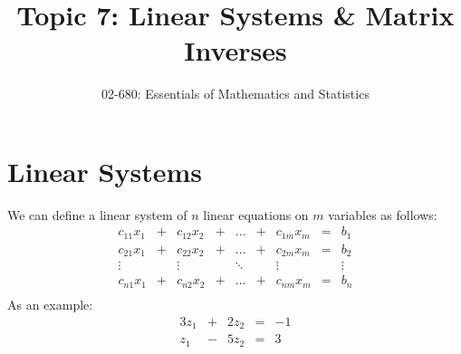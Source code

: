 


\title{Topic 7: Linear Systems \& Matrix Inverses}
\author{02-680: Essentials of Mathematics and Statistics}


\maketitle

\section{Linear Systems}
We can define a linear system of $n$ linear equations on $m$ variables as follows: 
\[\begin{array}{ccccccccc}
c_{11} x_1 & + & c_{12} x_2 & + & \hdots & + & c_{1m} x_m & = & b_1\\
c_{21} x_1 & + & c_{22} x_2 & + & \hdots & + & c_{2m} x_m & = & b_2\\
\vdots & & \vdots & & \ddots & & \vdots & & \vdots\\
c_{n1} x_1 & + & c_{n2} x_2 & + & \hdots & + & c_{nm} x_m & = & b_n\\
\end{array}\]
As an example: 
\[\begin{array}{rcrcr}
3 z_1 & + & 2 z_2 & = & -1\\
 z_1 & - & 5 z_2 & = & 3\\
\end{array}\]

